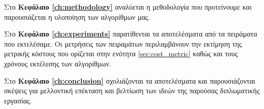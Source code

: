 Στο \textbf{Κεφάλαιο \ref{ch:methodology}} αναλύεται η μεθοδολογία 
που προτείνουμε και παρουσιάζεται η υλοποίηση των αλγορίθμων μας.

Στο \textbf{Κεφάλαιο \ref{ch:experiments}} παρατίθενται τα αποτελέσματα 
από τα πειράματα που εκτελέσαμε. 
Οι μετρήσεις των πειραμάτων περιλαμβάνουν την εκτίμηση της μετρικής 
κόστους που ορίζεται στην ενότητα \ref{sec:cost_metric} καθώς και τους χρόνους
εκτέλεσης των αλγορίθμων. 

Στο \textbf{Κεφάλαιο \ref{ch:conclusion}} σχολιάζονται τα αποτελέσματα
και παρουσιάζονται σκέψεις για μελλοντική επέκταση και βελτίωση των 
ιδεών της παρούσας διπλωματικής εργασίας.
